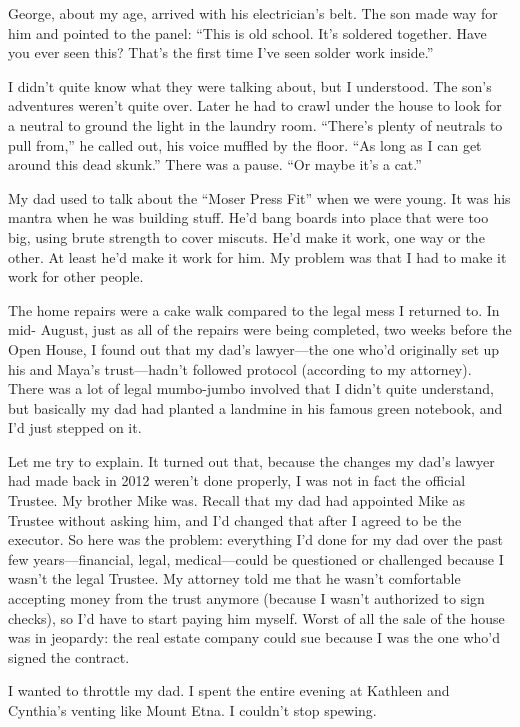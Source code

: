 \documentclass[12pt]{book}
\begin{document}
George, about my age, arrived with his electrician's belt. The son made way for him and pointed to the panel: ``This is old school. It's soldered together. Have you ever seen this? That's the first time I've seen solder work inside.''

I didn't quite know what they were talking about, but I understood. The son's adventures weren't quite over. Later he had to crawl under the house to look for a neutral to ground the light in the laundry room. ``There's plenty of neutrals to pull from,'' he called out, his voice muffled by the floor. ``As long as I can get around this dead skunk.'' There was a pause. ``Or maybe it's a cat.''

My dad used to talk about the ``Moser Press Fit'' when we were young. It was his mantra when he was building stuff. He'd bang boards into place that were too big, using brute strength to cover miscuts. He'd make it work, one way or the other. At least he'd make it work for him. My problem was that I had to make it work for other people.

The home repairs were a cake walk compared to the legal mess I returned to. In mid- August, just as all of the repairs were being completed, two weeks before the Open House, I found out that my dad's lawyer---the one who'd originally set up his and Maya's trust---hadn't followed protocol (according to my attorney). There was a lot of legal mumbo-jumbo involved that I didn't quite understand, but basically my dad had planted a landmine in his famous green notebook, and I'd just stepped on it.

Let me try to explain. It turned out that, because the changes my dad's lawyer had made back in 2012 weren't done properly, I was not in fact the official Trustee. My brother Mike was. Recall that my dad had appointed Mike as Trustee without asking him, and I'd changed that after I agreed to be the executor. So here was the problem: everything I'd done for my dad over the past few years---financial, legal, medical---could be questioned or challenged because I wasn't the legal Trustee. My attorney told me that he wasn't comfortable accepting money from the trust anymore (because I wasn't authorized to sign checks), so I'd have to start paying him myself. Worst of all the sale of the house was in jeopardy: the real estate company could sue because I was the one who'd signed the contract.

I wanted to throttle my dad. I spent the entire evening at Kathleen and Cynthia's venting like Mount Etna. I couldn't stop spewing.
\end{document}

